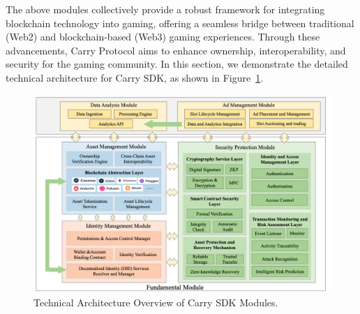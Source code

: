 The above modules collectively provide a robust framework for integrating blockchain technology into gaming, offering a seamless bridge between traditional (Web2) and blockchain-based (Web3) gaming experiences. Through these advancements, Carry Protocol aims to enhance ownership, interoperability, and security for the gaming community. In this section, we demonstrate the detailed technical architecture for Carry SDK, as shown in Figure~\ref{fig:modules}.  

\begin{figure}[!htb]
    \centering
    \includegraphics[width=\textwidth]{Technical Architecture Overview of Carry Modules.png}
    \caption{Technical Architecture Overview of Carry SDK Modules.}
    \label{fig:modules}
\end{figure}

